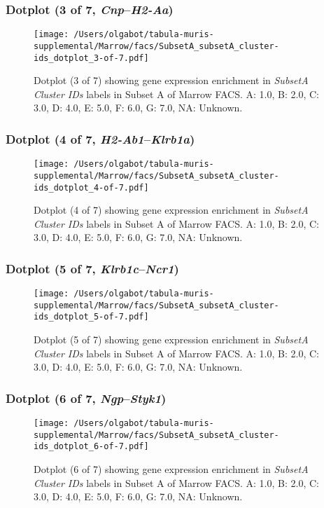 \clearpage

\subsubsection{Dotplot (3 of 7, \emph{Cnp}--\emph{H2-Aa})}
\begin{figure}[h]
\centering
\texttt{[image: /Users/olgabot/tabula-muris-supplemental/Marrow/facs/SubsetA\_subsetA\_cluster-ids\_dotplot\_3-of-7.pdf]}

\caption{ Dotplot (3 of 7)  showing gene expression enrichment in \emph{SubsetA Cluster IDs} labels in Subset A of Marrow FACS. A: 1.0, B: 2.0, C: 3.0, D: 4.0, E: 5.0, F: 6.0, G: 7.0, NA: Unknown.}
\end{figure}


\clearpage

\subsubsection{Dotplot (4 of 7, \emph{H2-Ab1}--\emph{Klrb1a})}
\begin{figure}[h]
\centering
\texttt{[image: /Users/olgabot/tabula-muris-supplemental/Marrow/facs/SubsetA\_subsetA\_cluster-ids\_dotplot\_4-of-7.pdf]}

\caption{ Dotplot (4 of 7)  showing gene expression enrichment in \emph{SubsetA Cluster IDs} labels in Subset A of Marrow FACS. A: 1.0, B: 2.0, C: 3.0, D: 4.0, E: 5.0, F: 6.0, G: 7.0, NA: Unknown.}
\end{figure}


\clearpage

\subsubsection{Dotplot (5 of 7, \emph{Klrb1c}--\emph{Ncr1})}
\begin{figure}[h]
\centering
\texttt{[image: /Users/olgabot/tabula-muris-supplemental/Marrow/facs/SubsetA\_subsetA\_cluster-ids\_dotplot\_5-of-7.pdf]}

\caption{ Dotplot (5 of 7)  showing gene expression enrichment in \emph{SubsetA Cluster IDs} labels in Subset A of Marrow FACS. A: 1.0, B: 2.0, C: 3.0, D: 4.0, E: 5.0, F: 6.0, G: 7.0, NA: Unknown.}
\end{figure}


\clearpage

\subsubsection{Dotplot (6 of 7, \emph{Ngp}--\emph{Styk1})}
\begin{figure}[h]
\centering
\texttt{[image: /Users/olgabot/tabula-muris-supplemental/Marrow/facs/SubsetA\_subsetA\_cluster-ids\_dotplot\_6-of-7.pdf]}

\caption{ Dotplot (6 of 7)  showing gene expression enrichment in \emph{SubsetA Cluster IDs} labels in Subset A of Marrow FACS. A: 1.0, B: 2.0, C: 3.0, D: 4.0, E: 5.0, F: 6.0, G: 7.0, NA: Unknown.}
\end{figure}



